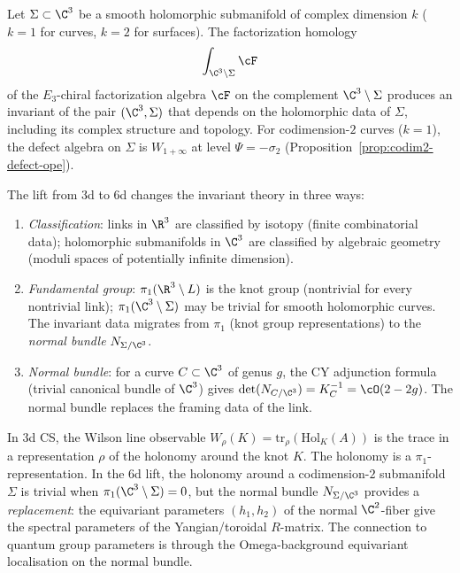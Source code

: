 \begin{conjecture}
\label{conj:cfg25-submanifold-invariants}
\ClaimStatusConjectured
Let $\Sigma \subset \C^3$ be a smooth holomorphic submanifold of complex dimension $k$ ($k = 1$ for curves, $k = 2$ for surfaces). The factorization homology
\[
 \int_{\C^3 \setminus \Sigma} \cF
\]
of the $E_3$-chiral factorization algebra $\cF$ on the complement $\C^3 \setminus \Sigma$ produces an invariant of the pair $(\C^3, \Sigma)$ that depends on the holomorphic data of $\Sigma$, including its complex structure and topology. For codimension-$2$ curves ($k = 1$), the defect algebra on $\Sigma$ is $W_{1+\infty}$ at level $\Psi = -\sigma_2$ (Proposition~\ref{prop:codim2-defect-ope}).

The lift from 3d to 6d changes the invariant theory in three ways:
\begin{enumerate}[label=\textup{(\alph*)}]
 \item \emph{Classification}: links in $\R^3$ are classified by isotopy (finite combinatorial data); holomorphic submanifolds in $\C^3$ are classified by algebraic geometry (moduli spaces of potentially infinite dimension).
 \item \emph{Fundamental group}: $\pi_1(\R^3 \setminus L)$ is the knot group (nontrivial for every nontrivial link); $\pi_1(\C^3 \setminus \Sigma)$ may be trivial for smooth holomorphic curves. The invariant data migrates from $\pi_1$ (knot group representations) to the \emph{normal bundle} $N_{\Sigma / \C^3}$.
 \item \emph{Normal bundle}: for a curve $C \subset \C^3$ of genus $g$, the CY adjunction formula (trivial canonical bundle of $\C^3$) gives $\det(N_{C/\C^3}) = K_C^{-1} = \cO(2-2g)$. The normal bundle replaces the framing data of the link.
\end{enumerate}
\end{conjecture}

\begin{remark}
\label{rem:pi1-to-normal-bundle}
In 3d CS, the Wilson line observable $W_\rho(K) = \mathrm{tr}_\rho(\mathrm{Hol}_K(A))$ is the trace in a representation $\rho$ of the holonomy around the knot $K$. The holonomy is a $\pi_1$-representation. In the 6d lift, the holonomy around a codimension-$2$ submanifold $\Sigma$ is trivial when $\pi_1(\C^3 \setminus \Sigma) = 0$, but the normal bundle $N_{\Sigma/\C^3}$ provides a \emph{replacement}: the equivariant parameters $(h_1, h_2)$ of the normal $\C^2$-fiber give the spectral parameters of the Yangian/toroidal $R$-matrix. The connection to quantum group parameters is through the Omega-background equivariant localisation on the normal bundle.
\end{remark}

